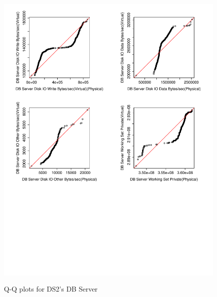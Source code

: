 \begin{figure}[tbh]
	\centering
	{\includegraphics[width=1.0\textwidth]{figures/appendix/qq_plots/DS2/DB_Server/Fourth_four.pdf}}
	\caption{Q-Q plots for DS2's DB Server}
\end{figure}








